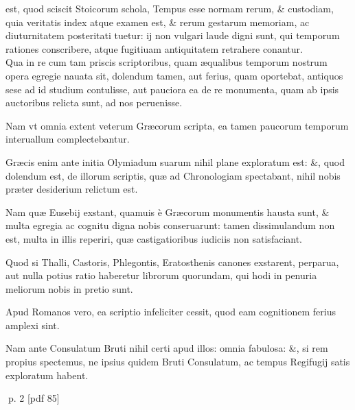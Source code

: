 \setcounter{parcount}{0}
\begin{parnumbers}
 est, quod sciscit Stoicorum schola, Tempus esse normam rerum, \& custodiam, quia veritatis index atque examen est, \& rerum gestarum memoriam, ac diuturnitatem posteritati tuetur: ij non vulgari laude digni sunt, qui temporum rationes conscribere, atque fugitiuam antiquitatem retrahere conantur.
\\ \p
Qua in re cum tam priscis scriptoribus, quam æqualibus temporum nostrum opera egregie nauata sit, dolendum tamen, aut
ferius, quam oportebat, antiquos sese ad id studium contulisse, aut pauciora ea de re monumenta, quam ab ipsis
auctoribus relicta sunt, ad nos peruenisse.

Nam vt omnia extent veterum Græcorum scripta, ea tamen paucorum temporum interuallum complectebantur.

Græcis enim ante initia Olymiadum suarum nihil plane exploratum est: \&, quod dolendum est, de illorum scriptis, quæ ad Chronologiam spectabant, nihil nobis præter desiderium relictum est.

Nam quæ Eusebij exstant, quamuis è Græcorum monumentis hausta sunt, \& multa egregia ac cognitu digna nobis conseruarunt: tamen dissimulandum non est, multa in illis reperiri, quæ castigatioribus iudiciis non satisfaciant.

Quod si Thalli, Castoris, Phlegontis, Eratosthenis canones exstarent, perparua, aut nulla potius ratio haberetur librorum quorundam, qui hodi in penuria meliorum nobis in pretio sunt.

Apud Romanos vero, ea scriptio infeliciter cessit, quod eam cognitionem ferius amplexi sint.

Nam ante Consulatum Bruti nihil certi apud illos: omnia fabulosa: \&, si rem propius spectemus, ne ipsius quidem Bruti Consulatum, ac tempus Regifugij satis exploratum habent.

\end{parnumbers}
\clearpage
p. 2 [pdf 85]

